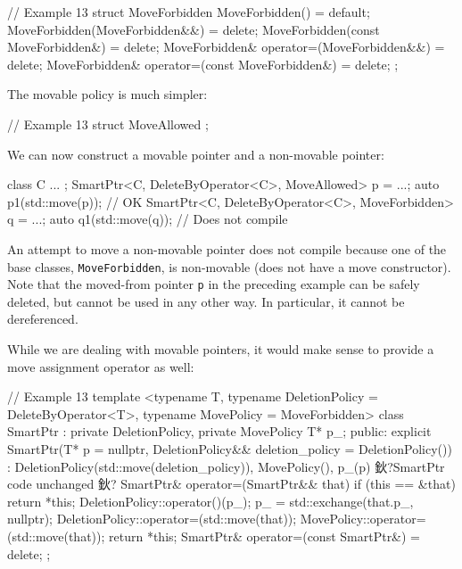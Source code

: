 \begin{code}
// Example 13
struct MoveForbidden {
  MoveForbidden() = default;
  MoveForbidden(MoveForbidden&&) = delete;
  MoveForbidden(const MoveForbidden&) = delete;
  MoveForbidden& operator=(MoveForbidden&&) = delete;
  MoveForbidden& operator=(const MoveForbidden&) = delete;
};
\end{code}

The movable policy is much simpler:

\begin{code}
// Example 13
struct MoveAllowed {
};
\end{code}

We can now construct a movable pointer and a non-movable pointer:

\begin{code}
class C { ... };
SmartPtr<C, DeleteByOperator<C>, MoveAllowed> p = ...;
auto p1(std::move(p)); // OK
SmartPtr<C, DeleteByOperator<C>, MoveForbidden> q = ...;
auto q1(std::move(q)); // Does not compile
\end{code}

An attempt to move a non-movable pointer does not compile because one of the base classes, \texttt{MoveForbidden}, is non-movable (does not have a move constructor). Note that the moved-from pointer \texttt{p} in the preceding example can be safely deleted, but cannot be used in any other way. In particular, it cannot be dereferenced.

While we are dealing with movable pointers, it would make sense to provide a move assignment operator as well:

\begin{code}
// Example 13
template <typename T,
  typename DeletionPolicy = DeleteByOperator<T>,
  typename MovePolicy = MoveForbidden>
class SmartPtr : private DeletionPolicy,
                 private MovePolicy {
  T* p_;
  public:
  explicit SmartPtr(T* p = nullptr,
    DeletionPolicy&& deletion_policy = DeletionPolicy())
    : DeletionPolicy(std::move(deletion_policy)),
      MovePolicy(), p_(p) {}
  鈥?SmartPtr code unchanged 鈥?
  SmartPtr& operator=(SmartPtr&& that) {
    if (this == &that) return *this;
    DeletionPolicy::operator()(p_);
    p_ = std::exchange(that.p_, nullptr);
    DeletionPolicy::operator=(std::move(that));
    MovePolicy::operator=(std::move(that));
    return *this;
  }
  SmartPtr& operator=(const SmartPtr&) = delete;
};
\end{code}

